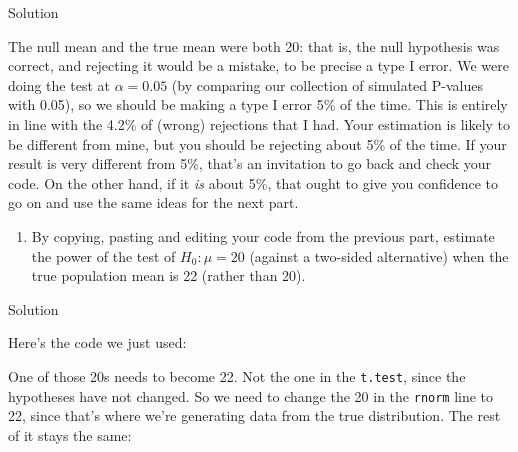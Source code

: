 \documentclass[]{tufte-book}
\newenvironment{Shaded}{}{}
\newcommand{\DataTypeTok}[1]{\textcolor[rgb]{0.56,0.13,0.00}{#1}}
\newcommand{\DecValTok}[1]{\textcolor[rgb]{0.25,0.63,0.44}{#1}}
\newcommand{\FloatTok}[1]{\textcolor[rgb]{0.25,0.63,0.44}{#1}}
\newcommand{\KeywordTok}[1]{\textcolor[rgb]{0.00,0.44,0.13}{\textbf{#1}}}
\newcommand{\NormalTok}[1]{#1}
\newcommand{\OperatorTok}[1]{\textcolor[rgb]{0.40,0.40,0.40}{#1}}
\newcommand{\StringTok}[1]{\textcolor[rgb]{0.25,0.44,0.63}{#1}}
\providecommand{\tightlist}{%
  \setlength{\itemsep}{0pt}\setlength{\parskip}{0pt}}
\theoremstyle{definition}
\theoremstyle{definition}
\theoremstyle{definition}
\theoremstyle{remark}
\begin{document}
Solution

The null mean and the true mean were both 20: that is, the null
hypothesis was correct, and rejecting it would be a mistake, to be
precise a type I error. We were doing the test at \(\alpha=0.05\) (by
comparing our collection of simulated P-values with 0.05), so we should
be making a type I error 5\% of the time. This is entirely in line with
the 4.2\% of (wrong) rejections that I had. Your estimation is likely to
be different from mine, but you should be rejecting about 5\% of the
time. If your result is very different from 5\%, that's an invitation to
go back and check your code. On the other hand, if it \emph{is} about
5\%, that ought to give you confidence to go on and use the same ideas
for the next part.

\begin{enumerate}
\def\labelenumi{(\alph{enumi})}
\setcounter{enumi}{3}
\tightlist
\item
  By copying, pasting and editing your code from the previous part,
  estimate the power of the test of \(H_0: \mu=20\) (against a two-sided
  alternative) when the true population mean is 22 (rather than 20).
\end{enumerate}

Solution

Here's the code we just used:

\begin{Shaded}
\end{Shaded}

One of those 20s needs to become 22. Not the one in the \texttt{t.test},
since the hypotheses have not changed. So we need to change the 20 in
the \texttt{rnorm} line to 22, since that's where we're generating data
from the true distribution. The rest of it stays the same:
\end{document}
